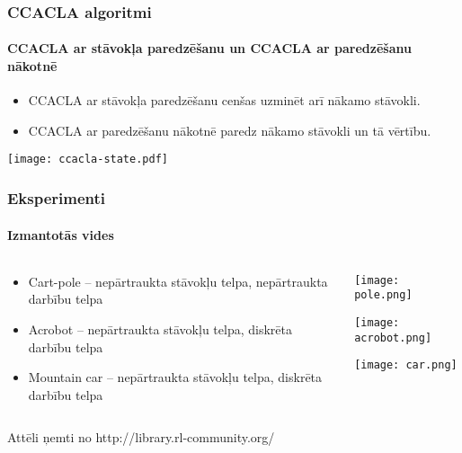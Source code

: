 \documentclass[xetex,mathserif]{beamer}
\begin{document}
  \begin{frame}
    \frametitle{CCACLA algoritmi}
    \framesubtitle{CCACLA ar stāvokļa paredzēšanu un CCACLA ar paredzēšanu nākotnē}
    \begin{itemize}
      \item CCACLA ar stāvokļa paredzēšanu cenšas uzminēt arī nākamo stāvokli.
      \item CCACLA ar paredzēšanu nākotnē paredz nākamo stāvokli un tā vērtību.
    \end{itemize}
    \begin{center}
      \hspace{2cm} \texttt{[image: ccacla-state.pdf]}
    \end{center}
  \end{frame}
  
  \begin{frame}
    \frametitle{Eksperimenti}
    \framesubtitle{Izmantotās vides}
    \begin{columns}[C]
    \begin{column}[C]{5cm}
      \begin{itemize}
        \item Cart-pole -- nepārtraukta stāvokļu telpa, nepārtraukta darbību telpa
        \item Acrobot -- nepārtraukta stāvokļu telpa, diskrēta darbību telpa
        \item Mountain car -- nepārtraukta stāvokļu telpa, diskrēta darbību telpa
      \end{itemize}

    \end{column}
    \begin{column}[C]{5cm}
      \texttt{[image: pole.png]}

      \vspace{1cm}
      \texttt{[image: acrobot.png]}

      \vspace{0.7cm}
      \texttt{[image: car.png]}
    \end{column}
    \end{columns}
      \tiny{Attēli ņemti no http://library.rl-community.org/}
  \end{frame}

\end{document}
